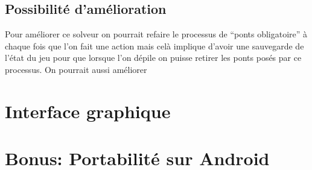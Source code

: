 \documentclass[12pt]{report}
\begin{document}
\section{Possibilité d'amélioration}
Pour améliorer ce solveur on pourrait refaire le processus de ``ponts obligatoire'' à chaque fois que l'on fait une action mais celà implique d'avoir une sauvegarde de l'état du jeu pour que lorsque l'on dépile on puisse retirer les ponts posés par ce processus. On pourrait aussi améliorer 

\newpage
\chapter{Interface graphique}
\newpage
\chapter{Bonus: Portabilité sur Android}
\newpage
\end{document}
